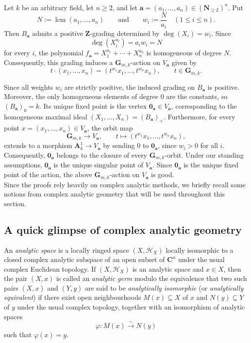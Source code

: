 \documentclass[english,10pt,reqno,twoside]{amsart}
\numberwithin{equation}{section}
\numberwithin{figure}{section}
\theoremstyle{plain}
\theoremstyle{plain}
\theoremstyle{definition}
\theoremstyle{plain}
\numberwithin{equation}{section}
\newcommand{\A}{\mathbf{A}}
\newcommand{\C}{\mathbf{C}}
\newcommand{\G}{\mathbf{G}}
\newcommand{\N}{\mathbf{N}}
\newcommand{\oo}{\mathbf{0}}
\newcommand{\Z}{\mathbf{Z}}
\newcommand{\ba}{\mathbf{a}}
\begin{document}
Let $k$ be an arbitrary field, let $n\geq 2$, and let $\ba=(a_1,\ldots,a_n)\in(\N_{\geq 2})^n$. Put
\[
N:=\operatorname{lcm}(a_1,\ldots,a_n)
\qquad\text{and}\qquad
w_i:=\frac{N}{a_i}
\quad (1\leq i\leq n).
\]
Then $B_\ba$ admits a positive $\Z$-grading determined by $\deg(X_i)=w_i$. Since
\[
\deg(X_i^{a_i})=a_iw_i=N
\]
for every $i$, the polynomial $f_\ba=X_1^{a_1}+\cdots+X_n^{a_n}$ is homogeneous of degree $N$. Consequently, this grading induces a $\G_{m,k}$-action on $V_\ba$ given by
\[
t\cdot(x_1,\ldots,x_n)
= (t^{w_1}x_1,\ldots,t^{w_n}x_n),
\qquad
t\in\G_{m,k}.
\]

Since all weights $w_i$ are strictly positive, the induced grading on $B_\ba$ is positive. Moreover, the only homogeneous elements of degree $0$ are the constants, so $(B_\ba)_0=k$. Its unique fixed point is the vertex $\oo_\ba\in V_\ba$, corresponding to the homogeneous maximal ideal $(X_1,\ldots,X_n)=(B_\ba)_+$. Furthermore, for every point $x=(x_1,\ldots,x_n)\in V_\ba$, the orbit map
\[
\G_{m,k}\longrightarrow V_\ba,
\qquad
t\longmapsto
(t^{w_1}x_1,\ldots,t^{w_n}x_n),
\]
extends to a morphism $\A^1_k\to V_\ba$ by sending $0$ to $\oo_\ba$, since $w_i>0$ for all $i$. Consequently, $\oo_\ba$ belongs to the closure of every $\G_{m,k}$-orbit. Under our standing assumptions, $\oo_\ba$ is the unique singular point of $V_\ba$. Since $\oo_\ba$ is the unique fixed point of the action, the above $\G_{m,k}$-action on $V_\ba$ is good.\\

Since the proofs rely heavily on complex analytic methods, we briefly recall some notions from complex analytic geometry that will be used throughout this section.

\subsection{A quick glimpse of complex analytic geometry}\label{subse2.2}
An \emph{analytic space} is a locally ringed space $(X,\mathcal{H}_X)$ locally isomorphic to a closed complex analytic subspace of an open subset of $\C^n$ under the usual complex Euclidean topology. If $(X,\mathcal{H}_X)$ is an analytic space and $x \in X$, then the pair $(X,x)$ is called an \emph{analytic germ} modulo the equivalence that two such pairs $(X,x)$ and $(Y,y)$ are said to be \emph{analytically isomorphic} (or \emph{analytically equivalent}) if there exist open neighbourhoods $M(x) \subseteq X$ of $x$ and $N(y) \subseteq Y$ of $y$ under the usual complex topology, together with an isomorphism of analytic spaces
\[
\varphi : M(x) \xrightarrow{\sim} N(y)
\]
such that $\varphi(x)=y$.
\end{document}
